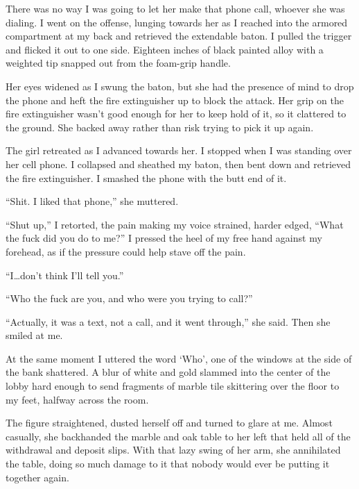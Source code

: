 There was no way I was going to let her make that phone call, whoever she was dialing.  I went on the offense, lunging towards her as I reached into the armored compartment at my back and retrieved the extendable baton.  I pulled the trigger and flicked it out to one side.  Eighteen inches of black painted alloy with a weighted tip snapped out from the foam-grip handle.



Her eyes widened as I swung the baton, but she had the presence of mind to drop the phone and heft the fire extinguisher up to block the attack.  Her grip on the fire extinguisher wasn't good enough for her to keep hold of it, so it clattered to the ground.  She backed away rather than risk trying to pick it up again.



The girl retreated as I advanced towards her.  I stopped when I was standing over her cell phone.  I collapsed and sheathed my baton, then bent down and retrieved the fire extinguisher.  I smashed the phone with the butt end of it.



``Shit.  I liked that phone,'' she muttered.



``Shut up,'' I retorted, the pain making my voice strained, harder edged, ``What the fuck did you do to me?''  I pressed the heel of my free hand against my forehead, as if the pressure could help stave off the pain.



``I\ldots don't think I'll tell you.''



``Who the fuck are you, and who were you trying to call?''



``Actually, it was a text, not a call, and it went through,'' she said.  Then she smiled at me.



At the same moment I uttered the word `Who', one of the windows at the side of the bank shattered.  A blur of white and gold slammed into the center of the lobby hard enough to send fragments of marble tile skittering over the floor to my feet, halfway across the room.



The figure straightened, dusted herself off and turned to glare at me.  Almost casually, she backhanded the marble and oak table to her left that held all of the withdrawal and deposit slips.  With that lazy swing of her arm, she annihilated the table, doing so much damage to it that nobody would ever be putting it together again.



